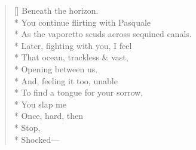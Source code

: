 \begin{verse}[\versewidth]
Beneath the horizon.\\*
You continue flirting with Pasquale\\*
As the vaporetto scuds across sequined canals.\\*
Later, fighting with you, I feel\\*
That ocean, trackless \& vast,\\*
Opening between us.\\*
And, feeling it too, unable\\*
To find a tongue for your sorrow,\\*
You slap me\\*
Once, hard, then\\*
Stop,\\*
\hspace*{2\vgap} Shocked---
\end{verse}
